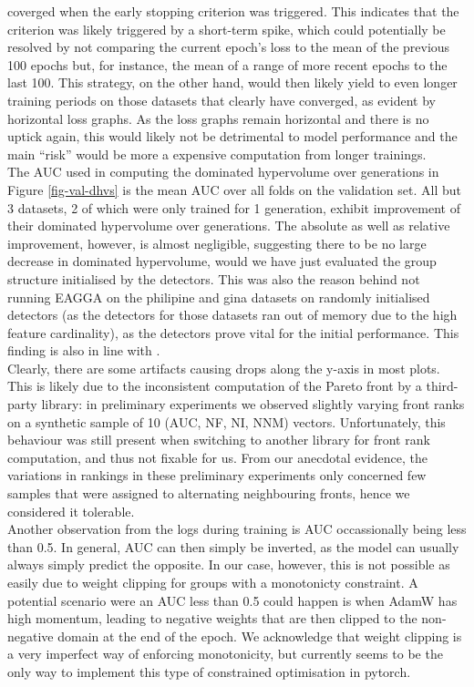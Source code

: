 \documentclass[twoside,11pt]{article}
\begin{document}
coverged when the early stopping criterion was triggered.
This indicates that the criterion was likely triggered by a short-term spike, which could potentially be resolved by not comparing the current epoch's loss
to the mean of the previous 100 epochs but, for instance, the mean of a range of more recent epochs to the last 100.
This strategy, on the other hand, would then likely yield to even longer training periods on those datasets that clearly have converged, as evident by
horizontal loss graphs.
As the loss graphs remain horizontal and there is no uptick again, this would likely not be detrimental to model performance and the main ``risk'' would be
more a expensive computation from longer trainings.
\\
The AUC used in computing the dominated hypervolume over generations in Figure \ref{fig-val-dhvs} is the mean AUC over all folds on the validation set.
All but 3 datasets, 2 of which were only trained for 1 generation, exhibit improvement of their dominated hypervolume over generations. The absolute as
well as relative improvement, however, is almost negligible, suggesting there to be no large decrease in dominated hypervolume, would we have just evaluated
the group structure initialised by the detectors.
This was also the reason behind not running EAGGA on the philipine and gina datasets on randomly initialised detectors (as the detectors for those datasets
ran out of memory due to the high feature cardinality), as the detectors prove vital for the initial performance. This finding is also in
line with \citep[Fig. 4, p. 545]{EAGGA}.
\\
Clearly, there are some artifacts causing drops along the y-axis in most plots. This is likely due to the inconsistent computation of the Pareto front
by a third-party library: in preliminary experiments we observed slightly varying front ranks on a synthetic sample of 10 (AUC, NF, NI, NNM) vectors.
Unfortunately, this behaviour was still present when switching to another library for front rank computation, and thus not fixable for us.
From our anecdotal evidence, the variations in rankings in these preliminary experiments only concerned few samples that were assigned to alternating
neighbouring fronts, hence we considered it tolerable.
\\
Another observation from the logs during training is AUC occassionally being less than 0.5.
In general, AUC can then simply be inverted, as the model can usually always simply predict the opposite.
In our case, however, this is not possible as easily due to weight clipping for groups with a monotonicty constraint.
A potential scenario were an AUC less than 0.5 could happen is when AdamW has high momentum, leading to negative weights that are then clipped to the
non-negative domain at the end of the epoch.
We acknowledge that weight clipping is a very imperfect way of enforcing monotonicity, but currently seems to be the only way to implement this type of
constrained optimisation in pytorch.
\end{document}

